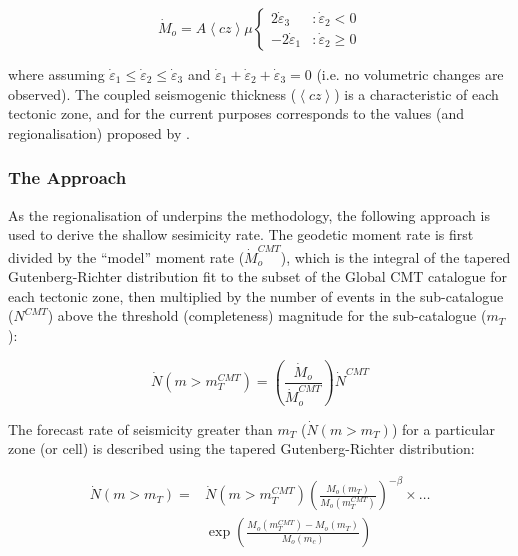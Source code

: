 \begin{equation}
\dot{M}_o = A \left\langle {cz} \right\rangle \mu \left\{\begin{array}{lr}
2\dot{\varepsilon}_3 &:\dot{\varepsilon}_2 < 0\\
-2\dot{\varepsilon}_1&:\dot{\varepsilon}_2 \geq 0
\end{array}\right.
\end{equation}
 
 where assuming $\dot{\varepsilon}_1 \leq \dot{\varepsilon}_2 \leq \dot{\varepsilon}_3$ and $\dot{\varepsilon}_1 + \dot{\varepsilon}_2 + \dot{\varepsilon}_3 = 0$ (i.e. no volumetric changes are observed). The coupled seismogenic thickness ($\left\langle cz \right\rangle$) is a characteristic of each tectonic zone, and for the current purposes corresponds to the values (and regionalisation) proposed by \cite{BirdKagan2004}. 
 
 \subsubsection{The \cite{BirdLiu2007} Approach}
 
 As the regionalisation of \citet{BirdKagan2004} underpins the \cite{BirdLiu2007} methodology, the following approach is used to derive the shallow sesimicity rate. The geodetic moment rate  is first divided by the ``model'' moment rate ($\dot{M}_o^{CMT}$), which is the integral of the tapered Gutenberg-Richter distribution fit to the subset of the Global CMT catalogue for each tectonic zone, then multiplied by the number of events in the sub-catalogue ($N^{CMT}$) above the threshold (completeness) magnitude for the sub-catalogue ($m_T$):
 
 \begin{equation}
 \dot{N} \left( {m > m_T^{CMT}} \right) = \left( {\frac{\dot{M}_o}{\dot{M}_o^{CMT}}} \right) \dot{N}^{CMT}
 \end{equation}

The forecast rate of seismicity greater than $m_T$ ($\dot{N} \left( {m > m_T} \right)$) for a particular zone (or cell) is described using the tapered Gutenberg-Richter distribution:

\begin{equation}
\begin{split}
\dot{N} \left( {m > m_T} \right) =& \dot{N} \left( {m > m_T^{CMT}} \right) \left( {\frac{M_o \left( {m_T} \right)}{M_o \left( {m_T^{CMT}} \right)}} \right)^{-\beta} \times \ldots \\
& \exp \left( {\frac{M_o \left( {m_T^{CMT}} \right) - M_o \left( {m_T} \right)}{M_o \left( {m_c} \right)}} \right)\end{split}
\end{equation}
 
